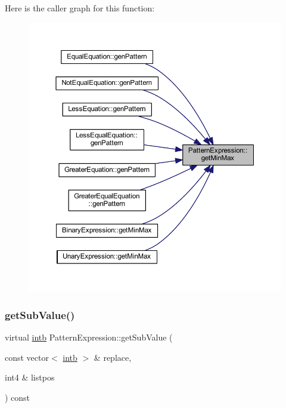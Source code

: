 Here is the caller graph for this function\+:
\nopagebreak
\begin{figure}[H]
\begin{center}
\leavevmode
\includegraphics[width=350pt]{class_pattern_expression_a4ceb88e89308ac58bf1af4174228f3a0_icgraph}
\end{center}
\end{figure}
\mbox{\label{class_pattern_expression_ade37db4aa76dd442b189bf4a6bb2d9dd}} 
\subsubsection{\texorpdfstring{getSubValue()}{getSubValue()}\hspace{0.1cm}{\footnotesize\ttfamily [1/2]}}
{\footnotesize\ttfamily virtual \mbox{\hyperlink{types_8h_aa925ba3e627c2df89d5b1cfe84fb8572}{intb}} Pattern\+Expression\+::get\+Sub\+Value (\begin{DoxyParamCaption}\item[{const vector$<$ \mbox{\hyperlink{types_8h_aa925ba3e627c2df89d5b1cfe84fb8572}{intb}} $>$ \&}]{replace,  }\item[{int4 \&}]{listpos }\end{DoxyParamCaption}) const\hspace{0.3cm}{\ttfamily [pure virtual]}}



